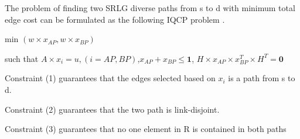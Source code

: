 The problem of finding two SRLG diverse paths from s to d with minimum total edge cost can be formulated as the following IQCP problem .

min $(w\times x_{AP},w\times x_{BP})$

such that $A\times x_i=u,(i=AP,BP)$,$x_{AP}+x_{BP}\leq \textbf{1}$, $H\times x_{AP}\times x_{BP}^T\times H^T = \textbf{0} $

Constraint (1) guarantees that the edges selected based on
$x_i$ is a path from s to d.

Constraint (2) guarantees that the two path is link-disjoint.

Constraint (3) guarantees that no one element in R is contained
in both paths
